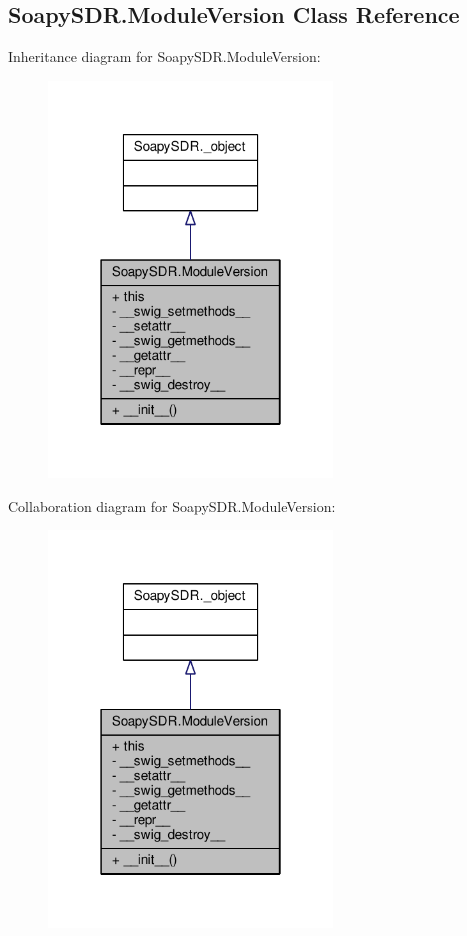 \subsection{Soapy\+S\+D\+R.\+Module\+Version Class Reference}
\label{classSoapySDR_1_1ModuleVersion}


Inheritance diagram for Soapy\+S\+D\+R.\+Module\+Version\+:
\nopagebreak
\begin{figure}[H]
\begin{center}
\leavevmode
\includegraphics[width=214pt]{df/de4/classSoapySDR_1_1ModuleVersion__inherit__graph}
\end{center}
\end{figure}


Collaboration diagram for Soapy\+S\+D\+R.\+Module\+Version\+:
\nopagebreak
\begin{figure}[H]
\begin{center}
\leavevmode
\includegraphics[width=214pt]{d1/d83/classSoapySDR_1_1ModuleVersion__coll__graph}
\end{center}
\end{figure}
